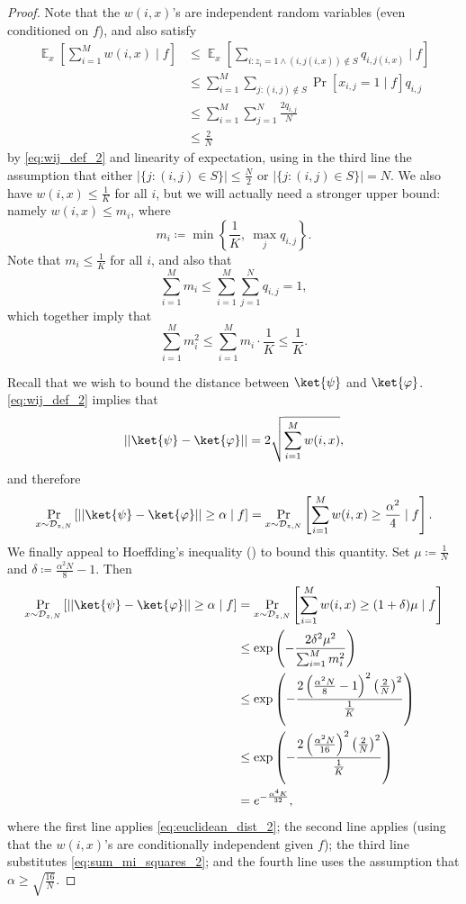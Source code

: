 \documentclass[10pt,a4paper]{article}
\newcommand{\E}{\mathop{\mathbb{E}}}
\begin{document}
\begin{proof}
Note that the $w(i,x)$'s are independent random variables (even conditioned on $f$), and also satisfy
\begin{align*}
\E_x \left[\sum_{i=1}^M w(i,x) \mid f\right] &\le \E_x \left[\sum_{i: z_i = 1 \land (i, j(i, x)) \not\in S} q_{i,j(i,x)} \mid f \right]\\
&\le \sum_{i=1}^M \sum_{j : (i, j) \not\in S} \Pr[x_{i,j} = 1 \mid f]q_{i,j}\\
&\le \sum_{i=1}^M \sum_{j=1}^N \frac{2q_{i,j}}{N}\\
&\le \frac{2}{N}
\end{align*}
by \eqref{eq:wij_def_2} and linearity of expectation, using in the third line the assumption that either $|\{j: (i, j) \in S\}| \le \frac{N}{2}$ or $|\{j: (i, j) \in S\}| = N$. We also have $w(i, x) \le \frac{1}{K}$ for all $i$, but we will actually need a stronger upper bound: namely $w(i, x) \le m_i$, where
\[
m_i \coloneqq \min\left\{\frac{1}{K},\ \max_j q_{i,j}\right\}.
\]
Note that $m_i \le \frac{1}{K}$ for all $i$, and also that
\[
\sum_{i=1}^M m_i \le \sum_{i=1}^M \sum_{j=1}^N q_{i,j} = 1,
\]
which together imply that
\begin{equation}
\label{eq:sum_mi_squares_2}
\sum_{i=1}^M m_i^2 \le \sum_{i=1}^M m_i \cdot \frac{1}{K} \le \frac{1}{K}.
\end{equation}

Recall that we wish to bound the distance between $\ket{\psi}$ and $\ket{\varphi}$. \eqref{eq:wij_def_2} implies that
\begin{equation}
|| \ket{\psi} - \ket{\varphi}|| = 2\sqrt{\sum_{i=1}^M w(i,x)},
\label{eq:euclidean_dist_2}
\end{equation}
and therefore
\[
\Pr_{x \sim \mathcal{D}_{z,N}} \left[|| \ket{\psi} - \ket{\varphi}|| \ge \alpha \mid f\right]
= \Pr_{x \sim \mathcal{D}_{z,N}} \left[\sum_{i=1}^M w(i,x) \ge \frac{\alpha^2}{4} \mid f \right].
\]
We finally appeal to Hoeffding's inequality () to bound this quantity. Set $\mu \coloneqq \frac{1}{N}$ and $\delta \coloneqq \frac{\alpha^2 N}{8} - 1$. Then
\begin{align*}
\Pr_{x \sim \mathcal{D}_{z,N}} \left[|| \ket{\psi} - \ket{\varphi}|| \ge \alpha \mid f\right]
&= \Pr_{x \sim \mathcal{D}_{z,N}} \left[\sum_{i=1}^M w(i,x) \ge (1 + \delta)\mu \mid f \right]\\
&\le \exp\left(-\frac{2\delta^2 \mu^2}{\sum_{i=1}^M m_i^2} \right)\\
&\le \exp\left(-\frac{2\left(\frac{\alpha^2N}{8} - 1\right)^2 \left(\frac{2}{N}\right)^2}{\frac{1}{K}} \right)\\
&\le \exp\left(-\frac{2\left(\frac{\alpha^2N}{16}\right)^2 \left(\frac{2}{N}\right)^2}{\frac{1}{K}} \right)\\
&= e^{-\frac{\alpha^4 K}{32}},
\end{align*}
where the first line applies \eqref{eq:euclidean_dist_2}; the second line applies  (using that the $w(i,x)$'s are conditionally independent given $f$); the third line substitutes \eqref{eq:sum_mi_squares_2}; and the fourth line uses the assumption that $\alpha \ge \sqrt{\frac{16}{N}}$.
\end{proof}
\end{document}
